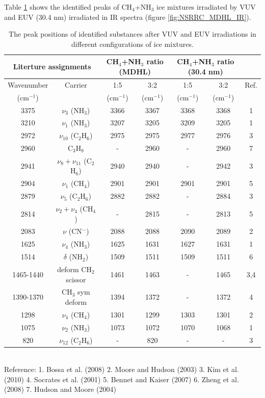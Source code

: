 Table \ref{tab:WavenumberNSRRC} shows the identified peaks of CH$_4$+NH$_3$ ice mixtures irradiated by VUV and EUV (30.4 nm) irradiated in IR spectra (figure \ref{fig:NSRRC_MDHL_IR}).

\begin{table}[htbp]
\caption{The peak positions of identified substances after VUV and EUV irradiations in different configurations of ice mixtures.}
\label{tab:WavenumberNSRRC}
\begin{tabular}{ccccccc}
\hline
\hline
\multicolumn{2}{c}{Literture assignments} & \multicolumn{2}{c}{CH$_4$+NH$_3$ ratio (MDHL)} & \multicolumn{2}{c}{CH$_4$+NH$_3$ ratio (30.4 nm)} \\
\hline
Wavenumber & Carrier  & 1:5 & 3:2 & 1:5 & 3:2 & Ref. \\
(cm$^{-1}$) &   & (cm$^{-1}$) & (cm$^{-1}$) & (cm$^{-1}$) & (cm$^{-1}$) &\\
\hline
3375 & $\nu_3$ (NH$_3$) & 3366 & 3367 & 3368 & 3368 & 1 \\
3210 & $\nu_1$ (NH$_3$) & 3207 & 3205 & 3209 & 3205 &1 \\
2972 & $\nu_{10}$ (C$_2$H$_6$) & 2975 & 2975 & 2977 & 2976 & 3 \\
2960 & C$_3$H$_8$ & - & 2960 & - & 2960 & 7 \\
2941 & $\nu_8+\nu_11$ (C$_2$H$_6$) & 2940 & 2940 & - & 2942 & 3 \\
2904 & $\nu_1$ (CH$_4$) & 2901 & 2901 & 2901 & 2901 & 5 \\
2879 & $\nu_5$ (C$_2$H$_6$) & 2882 & 2882 & - & 2884&  3 \\
2814 & $\nu_2+\nu_4$ (CH$_4$) & - & 2815 & - & 2813 & 5 \\
2083 & $\nu$ (CN$^-$) & 2088  & 2088 & 2090 & 2089 & 2 \\
1625 & $\nu_4$ (NH$_3$) & 1625 & 1631 & 1627 & 1631 & 1 \\
1514 & $\delta$ (NH$_2$) & 1509 & 1511 & 1509 & 1511 & 6 \\
1465-1440 & deform CH$_2$ scissor & 1461 & 1463 & - & 1465 & 3,4 \\
1390-1370 & CH$_3$ sym deform & 1394 & 1372 & - & 1372 & 4 \\
1298 & $\nu_4$ (CH$_4$) & 1301 & 1299 & 1303 & 1301 & 2 \\
1075 & $\nu_2$ (NH$_3$) & 1073 & 1072 & 1070 & 1068 & 1 \\
820 & $\nu_12$ (C$_2$H$_6$) & - & 820 & - & - & 3 \\
\hline
\end{tabular}\\
Reference: 1. Bossa et al. (2008) \cite{bossa2008carbamic} 2. Moore and Hudson (2003) \cite{moore2003infrared} 3. Kim et al. (2010) \cite{kim2010abiotic} 4. Socrates et al. (2001) \cite{socrates2001infrared} 5. Bennet and Kaiser (2007) \cite{bennett2007formation} 6. Zheng et al. (2008) \cite{zheng2008formation} 7. Hudson and Moore (2004) \cite{hudson2004reactions}
\end{table}


